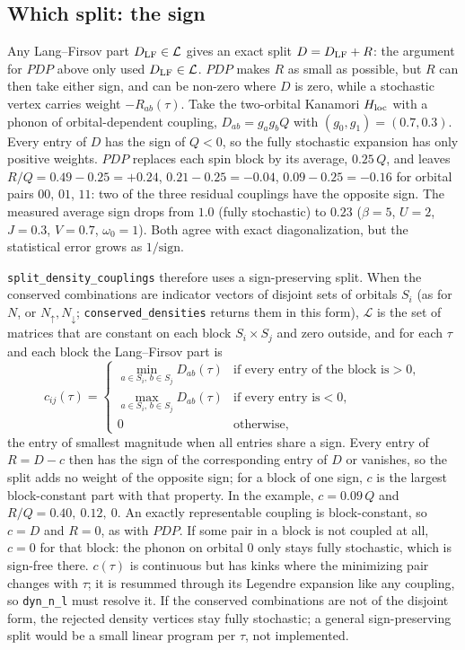 \documentclass[a4paper,12pt]{article}
\renewcommand{\t}{\ensuremath{\tau}}
\newcommand{\w}{\ensuremath{\omega}}
\newcommand{\Hloc}{\ensuremath{H_{\rm loc}}}
\begin{document}
\subsection{Which split: the sign}
\label{sec:split-sign}

Any Lang--Firsov part $D_{\rm LF}\in\mathcal L$ gives an exact split $D=D_{\rm LF}+R$: the
argument for $PDP$ above only used $D_{\rm LF}\in\mathcal L$. $PDP$ makes $R$ as small as
possible, but $R$ can then take either sign, and can be non-zero where $D$ is zero, while a
stochastic vertex carries weight $-R_{ab}(\t)$. Take the two-orbital Kanamori $\Hloc$ with a
phonon of orbital-dependent coupling, $D_{ab}=g_ag_bQ$ with $(g_0,g_1)=(0.7,0.3)$. Every entry of
$D$ has the sign of $Q<0$, so the fully stochastic expansion has only positive weights. $PDP$
replaces each spin block by its average, $0.25\,Q$, and leaves
$R/Q = 0.49-0.25 = +0.24$, $0.21-0.25 = -0.04$, $0.09-0.25 = -0.16$ for orbital pairs $00$,
$01$, $11$: two of the three residual couplings have the opposite sign. The measured average
sign drops from $1.0$ (fully stochastic) to $0.23$ ($\beta=5$, $U=2$, $J=0.3$, $V=0.7$,
$\w_0=1$). Both agree with exact diagonalization, but the statistical error grows as
$1/\text{sign}$.

\texttt{split\_density\_couplings} therefore uses a sign-preserving split. When the conserved
combinations are indicator vectors of disjoint sets of orbitals $S_i$ (as for $N$, or
$N_\uparrow,N_\downarrow$; \texttt{conserved\_densities} returns them in this form), $\mathcal L$
is the set of matrices that are constant on each block $S_i\times S_j$ and zero outside, and for
each $\t$ and each block the Lang--Firsov part is
\begin{equation}
  c_{ij}(\t)=\begin{cases}
    \min_{a\in S_i,\,b\in S_j} D_{ab}(\t) & \text{if every entry of the block is} >0,\\
    \max_{a\in S_i,\,b\in S_j} D_{ab}(\t) & \text{if every entry is} <0,\\
    0 & \text{otherwise,}
  \end{cases}
  \label{eq:signsplit}
\end{equation}
the entry of smallest magnitude when all entries share a sign. Every entry of $R=D-c$ then has
the sign of the corresponding entry of $D$ or vanishes, so the split adds no weight of the opposite
sign; for a block of one sign, $c$ is the largest block-constant part with that property. In the
example, $c=0.09\,Q$ and $R/Q=0.40,\ 0.12,\ 0$. An exactly representable coupling is
block-constant, so $c=D$ and $R=0$, as with $PDP$. If some pair in a block is not coupled at all,
$c=0$ for that block: the phonon on orbital 0 only stays fully stochastic, which is sign-free
there. $c(\t)$ is continuous but has kinks where the minimizing pair changes with $\t$; it is
resummed through its Legendre expansion like any coupling, so \texttt{dyn\_n\_l} must resolve
it. If the conserved combinations are not of the disjoint form, the rejected density vertices
stay fully stochastic; a general sign-preserving split would be a small linear program per $\t$,
not implemented.
\end{document}
